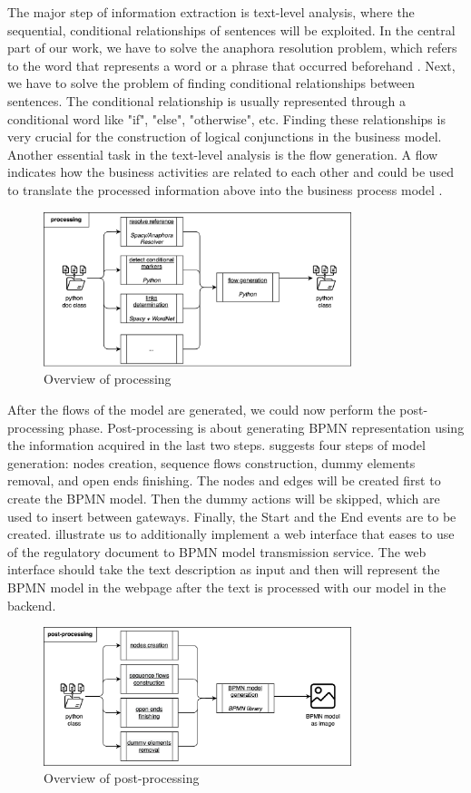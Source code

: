 The major step of information extraction is text-level analysis, where the sequential, conditional relationships of sentences will be exploited. In the central part of our work, we have to solve the anaphora resolution problem, which refers to the word that represents a word or a phrase that occurred beforehand \cite{literature_review_4}. Next, we have to solve the problem of finding conditional relationships between sentences. The conditional relationship is usually represented through a conditional word like "if", "else", "otherwise", etc. Finding these relationships is very crucial for the construction of logical conjunctions in the business model. Another essential task in the text-level analysis is the flow generation. A flow indicates how the business activities are related to each other and could be used to translate the processed information above into the business process model \cite{t2m_1}.

\begin{figure}[h]
    \centering
    \caption{Overview of processing}
    \includegraphics[width=0.8\textwidth]{tum-resources/images/theoretical_extraction_pro.png}
\end{figure}

After the flows of the model are generated, we could now perform the post-processing phase. Post-processing is about generating BPMN representation using the information acquired in the last two steps. \cite{t2m_1} suggests four steps of model generation: nodes creation, sequence flows construction, dummy elements removal, and open ends finishing. The nodes and edges will be created first to create the BPMN model. Then the dummy actions will be skipped, which are used to insert between gateways. Finally, the Start and the End events are to be created. \cite{complement_1} illustrate us to additionally implement a web interface that eases to use of the regulatory document to BPMN model transmission service. The web interface should take the text description as input and then will represent the BPMN model in the webpage after the text is processed with our model in the backend.

\begin{figure}[h]
    \centering
    \caption{Overview of post-processing}
    \includegraphics[width=0.8\textwidth]{tum-resources/images/theoretical_extraction_post.png}
\end{figure}
